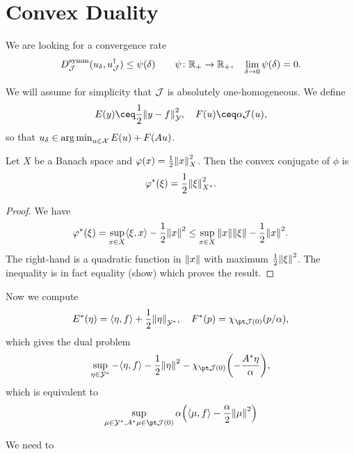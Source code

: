 \section{Convex Duality}
We are looking for a convergence rate
\[
D_\mathcal J^\mathrm{symm}(u_\delta, u_\mathcal J^\dagger) \leq \psi(\delta) \qquad \psi \colon \mathbb R_+ \to \mathbb R_+, \quad \lim_{\delta\to0}\psi(\delta) = 0. 
\]

We will assume for simplicity that $\mathcal J$ is absolutely one-homogeneous.  We define
\[
E(y) \ceq \frac12 \norm{y - f}_\YY^2, \quad F(u) \ceq \alpha \JJ(u), 
\]
so that $u_\delta \in \operatorname*{arg\,min}_{u \in \mathcal X} E(u) + F(Au)$. 

\begin{lemma}
	Let $X$ be a Banach space and $\varphi(x) = \frac12\norm{x}_X^2$. Then the convex conjugate of $\phi$ is
	\[
	\varphi^*(\xi) = \frac12 \norm{\xi}_{X^*}^2. 
	\]
\end{lemma}

\begin{proof}
	We have
	\[
	\varphi^*(\xi) = \sup_{x \in X} \langle\xi, x\rangle - \frac12 \norm{x}^2 \leq \sup_{x \in X} \norm{x} \norm{\xi} - \frac12 \norm{x}^2.
	\]
	The right-hand is a quadratic function in $\norm{x}$ with maximum $\frac12\norm{\xi}^2$. The inequality is in fact equality (\TODO show) which proves the result. 
\end{proof}

Now we compute
\[
E^*(\eta) = \ang{\eta, f} + \frac12 \norm{\eta}_{\YY^*}, \quad F^*(p) = \chi_{\pt \JJ(0)} (p/\alpha), 
\]
which gives the dual problem
\[
\sup_{\eta \in \YY^*} - \ang{\eta, f} - \frac12\norm{\eta}^2 - \chi_{\pt \JJ(0)} \qty(-\frac{A^*\eta}{\alpha}),
\]
which is equivalent to
\[
\sup_{\mu \in \YY^*, A^*\mu \in \pt \JJ(0)} \alpha \qty(\ang{\mu, f} - \frac\alpha2 \norm{\mu}^2)
\]

We need to 